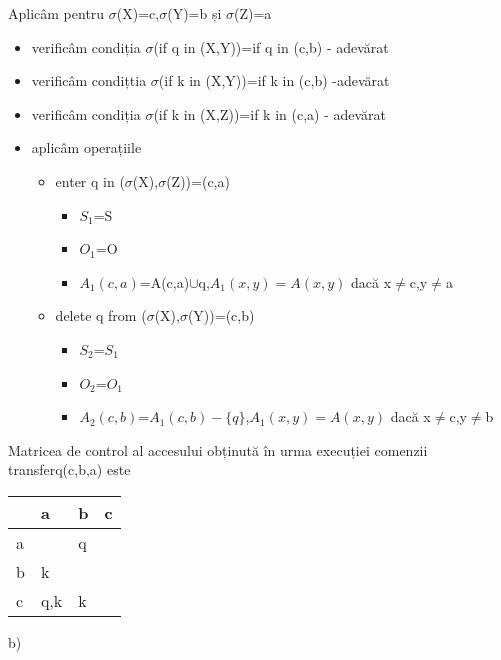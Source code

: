 \documentclass{article}
\begin{document}
Aplicâm pentru $\sigma$(X)=c,$\sigma$(Y)=b și $\sigma$(Z)=a
\begin{itemize}
        \item verificâm condiția $\sigma$(if q in (X,Y))=if q in (c,b) - adevărat
        \item verificâm condițtia $\sigma$(if k in (X,Y))=if k in (c,b) -adevărat
        \item verificâm condiția $\sigma$(if k in (X,Z))=if k in (c,a) - adevărat
        \item aplicâm operațiile
            \begin{itemize}
                \item enter q in ($\sigma$(X),$\sigma$(Z))=(c,a)
                    \begin{itemize}
                        \item $S_1$=S
                        \item $O_1$=O
                        \item $A_1(c,a)$=A(c,a)$\cup${q},$A_1(x,y)=A(x,y)$ dacă x$\neq$c,y$\neq$a
                    \end{itemize}
                \item delete q from ($\sigma$(X),$\sigma$(Y))=(c,b)
                    \begin{itemize}
                        \item $S_2$=$S_1$
                        \item $O_2$=$O_1$
                        \item $A_2(c,b)$=$A_1(c,b)-\{q\}$,$A_1(x,y)=A(x,y)$ dacă x$\neq$c,y$\neq$b
                    \end{itemize}
            \end{itemize}
    \end{itemize}
    Matricea de control al accesului obținută în urma execuției comenzii transferq(c,b,a) este
    \begin{center}
        \begin{tabular}{|l|l|l|l|} 
        \hline
          & a   & b & c  \\ 
        \hline
        a &     & q &    \\ 
        \hline
        b & k   &   &    \\ 
        \hline
        c & q,k & k &    \\
        \hline
        \end{tabular}
    \end{center}

b) 
\end{document}
